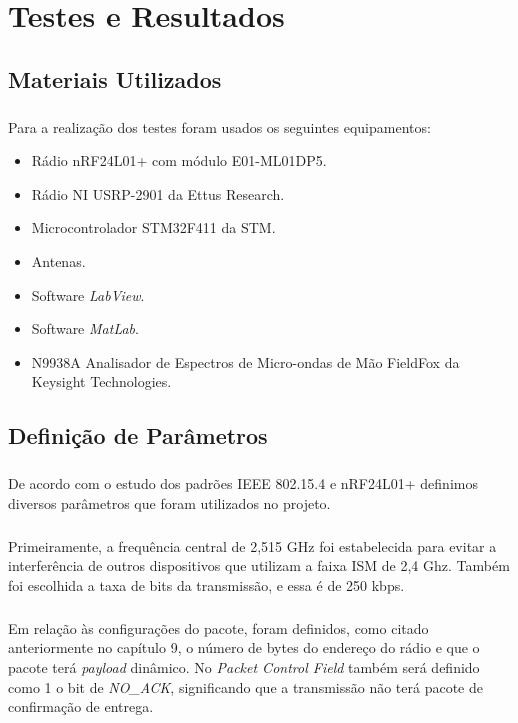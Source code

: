 \chapter{Testes e Resultados}
\noindent

\section{Materiais Utilizados}
\paragraph{} Para a realização dos testes foram usados os seguintes equipamentos:

\begin{itemize}
   \item Rádio nRF24L01+ com módulo E01-ML01DP5.
   \item Rádio NI USRP-2901 da Ettus Research.
   \item Microcontrolador STM32F411 da STM.
   \item Antenas.
   \item Software \textit{LabView}.
   \item Software \textit{MatLab}.
   \item N9938A Analisador de Espectros de Micro-ondas de Mão FieldFox da Keysight Technologies.
\end{itemize}

\section{Definição de Parâmetros}
\paragraph{} De acordo com o estudo dos padrões IEEE 802.15.4 e nRF24L01+ definimos diversos parâmetros que foram utilizados no projeto. 

\paragraph{} Primeiramente,  a frequência central de 2,515 GHz foi estabelecida para evitar a interferência de outros dispositivos que utilizam a faixa ISM de 2,4 Ghz. Também foi escolhida a taxa de bits da transmissão, e essa é de 250 kbps.

\paragraph{} Em relação às configurações do pacote, foram definidos, como citado anteriormente no capítulo 9, o número de bytes do endereço do rádio e que o pacote terá \textit{payload} dinâmico. No \textit{Packet Control Field} também será definido como 1 o bit de \textit{NO\_ACK}, significando que a transmissão não terá pacote de confirmação de entrega.

